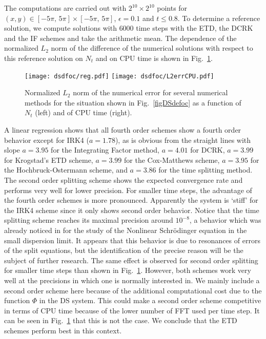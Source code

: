 \documentclass[final]{siamltex}
\begin{document}
The computations are carried out with $2^{10}\times2^{10}$ points
for $(x, y)\in[-5\pi,\,5\pi]\times[-5\pi,\,5\pi]$, $\epsilon=0.1$
and $t\leq0.8$. To determine a reference solution, we compute solutions
with $6000$ time steps with the ETD, the DCRK and the IF schemes
and take the arithmetic mean. The dependence of the normalized $L_{2}$
norm of the difference of the numerical solutions with respect to
this reference solution on $N_{t}$
and on CPU time is shown in 
Fig.~\ref{figDSdefocsmallreg}.
\begin{figure}[htb!]
 \centering
 \texttt{[image: dsdfoc/reg.pdf]}
 \texttt{[image: dsdfoc/L2errCPU.pdf]}
 \caption{Normalized $L_{2}$ norm of the numerical error for several numerical
methods for the situation shown in Fig.~\ref{figDSdefoc} as a 
function of $N_{t}$ (left) and of CPU time (right).}
    \label{figDSdefocsmallreg}
\end{figure}
A linear regression shows
 that all fourth order schemes show a fourth order behavior except 
for IRK4 ($a=1.78$), as is obvious from the 
 straight lines with slope
 $a=3.95$ for the Integrating Factor method, $a=4.01$ for
 DCRK,
$a=3.99$ for Krogstad's ETD scheme, $a=3.99$ for the Cox-Matthews 
scheme, $a=3.95$ 
for the Hochbruck-Ostermann scheme, and $a=3.86$ for the time 
splitting method. The second order splitting scheme shows the 
expected convergence rate and performs very well for lower precision. For 
smaller time steps, the advantage of the fourth order schemes is more 
pronounced.  Apparently the system is `stiff' for the IRK4 
scheme since it only shows second order behavior.
Notice that the time splitting scheme reaches its maximal precision 
around $10^{-8}$, a behavior which was 
already noticed in \cite{ckkdvnls} for the study 
of the Nonlinear Schr\"odinger equation
 in the small dispersion limit. It appears that this behavior is due 
 to resonances of errors of the split equations, but the 
 identification of the precise 
 reason will be the subject of further research. The same effect is observed for second 
 order splitting for smaller time steps than shown in 
 Fig.~\ref{figDSdefocsmallreg}. However, both schemes work very well 
 at the precisions in which one is normally interested in. 
 We mainly include a second order 
 scheme here because of the additional computational cost due to the 
 function $\Phi$ in the DS system. This could make a second order 
 scheme competitive in terms of CPU time because of the lower number 
 of FFT used per time step. It can be seen in 
 Fig.~\ref{figDSdefocsmallreg} that this is not the case.
We conclude that the ETD schemes perform best in this context.
\end{document}
